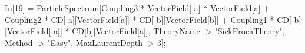In[19]:= ParticleSpectrum[Coupling3 * VectorField[-a] * VectorField[a] + Coupling2 * CD[-a][VectorField[a]] * CD[-b][VectorField[b]] + Coupling1 * CD[-b][VectorField[-a]] * CD[b][VectorField[a]], TheoryName -> "SickProcaTheory", Method -> "Easy", MaxLaurentDepth -> 3]; 